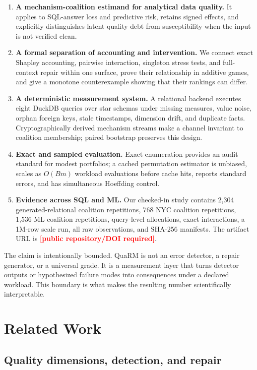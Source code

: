 \documentclass[conference]{IEEEtran}
\newcommand{\method}{QuaRM}
\newcommand{\TODO}[1]{\textcolor{red}{\textbf{[#1]}}}
\begin{document}
\begin{enumerate}
  \item \textbf{A mechanism-coalition estimand for analytical data quality.} It applies to SQL-answer loss and predictive risk, retains signed effects, and explicitly distinguishes latent quality debt from susceptibility when the input is not verified clean.
  \item \textbf{A formal separation of accounting and intervention.} We connect exact Shapley accounting, pairwise interaction, singleton stress tests, and full-context repair within one surface, prove their relationship in additive games, and give a monotone counterexample showing that their rankings can differ.
  \item \textbf{A deterministic measurement system.} A relational backend executes eight DuckDB queries over star schemas under missing measures, value noise, orphan foreign keys, stale timestamps, dimension drift, and duplicate facts. Cryptographically derived mechanism streams make a channel invariant to coalition membership; paired bootstrap preserves this design.
  \item \textbf{Exact and sampled evaluation.} Exact enumeration provides an audit standard for modest portfolios; a cached permutation estimator is unbiased, scales as $O(Bm)$ workload evaluations before cache hits, reports standard errors, and has simultaneous Hoeffding control.
  \item \textbf{Evidence across SQL and ML.} Our checked-in study contains 2,304 generated-relational coalition repetitions, 768 NYC coalition repetitions, 1,536 ML coalition repetitions, query-level allocations, exact interactions, a 1M-row scale run, all raw observations, and SHA-256 manifests. The artifact URL is \TODO{public repository/DOI required}.
\end{enumerate}

The claim is intentionally bounded. \method{} is not an error detector, a repair generator, or a universal grade. It is a measurement layer that turns detector outputs or hypothesized failure modes into consequences under a declared workload. This boundary is what makes the resulting number scientifically interpretable.

\section{Related Work}

\subsection{Quality dimensions, detection, and repair}
\end{document}

